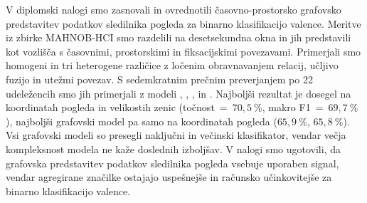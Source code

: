 V diplomski nalogi smo zasnovali in ovrednotili časovno-prostorsko grafovsko predstavitev podatkov sledilnika pogleda za binarno klasifikacijo valence.
Meritve iz zbirke MAHNOB-HCI smo razdelili na desetsekundna okna in jih predstavili kot vozlišča s časovnimi, prostorskimi in fiksacijskimi povezavami.
Primerjali smo homogeni  in tri heterogene različice z ločenim obravnavanjem relacij, učljivo fuzijo in utežmi povezav.
S sedemkratnim prečnim preverjanjem po 22 udeležencih smo jih primerjali z modeli , , ,  in .
Najboljši rezultat je dosegel  na koordinatah pogleda in velikostih zenic (točnost~=~$70{,}5~\%$, makro F1~=~$69{,}7~\%$), najboljši grafovski model  pa samo na koordinatah pogleda ($65{,}9~\%$, $65{,}8~\%$).
Vsi grafovski modeli so presegli naključni in večinski klasifikator, vendar večja kompleksnost modela ne kaže doslednih izboljšav.
V nalogi smo ugotovili, da grafovska predstavitev podatkov sledilnika pogleda vsebuje uporaben signal, vendar agregirane značilke ostajajo uspešnejše in računsko učinkovitejše za binarno klasifikacijo valence.
